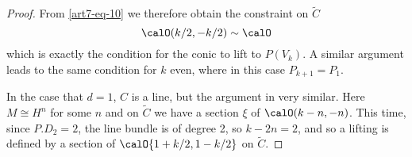 \begin{proof}
From \eqref{art7-eq-10} we therefore obtain the constraint on $\tilde{C}$
\begin{equation}\label{art7-eq-11}
\calO(k/2, -k/2)\sim \calO
\end{equation}
which is exactly the condition for the conic to lift to $P(V_{k})$. A similar argument leads to the same condition for $k$ even, where in this case $P_{k+1} = P_{1}$.

In the case that $d =1$, $C$ is a line, but the argument in  very similar. Here $M\cong H^{n}$ for some $n$ and on $\tilde{C}$ we have a section $\xi$ of $\calO(k-n, -n)$. This time, since $P.D_{2} = 2$, the line bundle is of degree 2, so $k-2n =2$, and so a lifting is defined by a section of $\calO{1+k/2, 1-k/2}$ on $\tilde{C}$.
\end{proof}

\medskip
